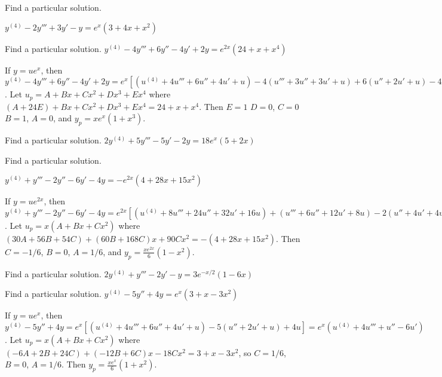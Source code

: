 \documentclass{ximera}
\begin{document}
\begin{problem}\label{exer:9.3.17}   Find a particular solution.

$y^{(4)}-2y'''+3y'-y=e^x(3+4x+x^2)$
\end{problem}

\begin{problem}\label{exer:9.3.18}   Find a particular solution.   $y^{(4)}-4y'''+6y''-4y'+2y=e^{2x}(24+x+x^4)$

\begin{solution}
If $y=ue^x$, then
$y^{(4)}-4y'''+6y''-4y'+2y=e^x[ (u^{(4)}+4u'''+6u''+4u'+u)
-4(u'''+3u''+3u'+u) +6(u''+2u'+u) -4(u'+u) +2u]= e^x(u^{(4)}+u)$. Let
$u_p=A+Bx+Cx^2+Dx^3+Ex^4$ where $ (A+24E)+Bx+Cx^2+Dx^3+Ex^4=24+x+x^4$.
Then $E=1$ $D=0$, $C=0$ $B=1$, $A=0$, and $y_p=xe^x(1+x^3)$.
\end{solution}
\end{problem}

\begin{problem}\label{exer:9.3.19}   Find a particular solution.   $2y^{(4)}+5y'''-5y'-2y=18e^x(5+2x)$
\end{problem}

\begin{problem}\label{exer:9.3.20}   Find a particular solution.

$y^{(4)}+y'''-2y''-6y'-4y=-e^{2x}(4+28x+15x^2)$

\begin{solution}
If $y=ue^{2x}$, then
$y^{(4)}+y'''-2y''-6y'-4y=e^{2x}[ (u^{(4)}+8u'''+24u''+32u'+16u)
+(u'''+6u''+12u'+8u) -2(u''+4u'+4u) -6(u'+2u) -4u]=
e^{2x}(u^{(4)}+9u'''+28u''+30u')$. Let $u_p=x(A+Bx+Cx^2)$ where
$(30A+56B+54C)+ (60B+168C)x +90Cx^2=-(4+28x+15x^2)$. Then $C=-1/6$,
$B=0$, $A=1/6$, and $y_p=\frac{xe^{2x}}{6}(1-x^2)$.
\end{solution}
\end{problem}

\begin{problem}\label{exer:9.3.21}   Find a particular solution.   
$2y^{(4)}+y'''-2y'-y=3e^{-x/2}(1-6x)$
\end{problem}

\begin{problem}\label{exer:9.3.22}   Find a particular solution.   
$y^{(4)}-5y''+4y=e^x(3+x-3x^2)$

\begin{solution}
If $y=ue^x$, then $y^{(4)}-5y''+4y=e^x[
(u^{(4)}+4u'''+6u''+4u'+u) -5(u''+2u'+u) +4u]
=e^x(u^{(4)}+4u'''+u''-6u')$. Let $u_p=x(A+Bx+Cx^2)$ where
$(-6A+2B+24C)+(-12B+6C)x-18Cx^2=3+x-3x^2$, so $C=1/6$, $B=0$, $A=1/6$.
Then $y_p=\frac{xe^x}{6}(1+x^2)$.
\end{solution}
\end{problem}
\end{document}
